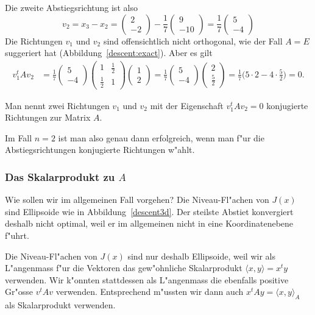 Die zweite Abstiegsrichtung ist also
\[
v_2=
x_3-x_2
=\begin{pmatrix}2\\-2\end{pmatrix}-
\frac17\begin{pmatrix}9\\-10\end{pmatrix}
=
\frac17\begin{pmatrix}5\\-4\end{pmatrix}
\]
Die Richtungen $v_1$ und $v_2$ sind offensichtlich nicht orthogonal,
wie der Fall $A=E$ suggeriert hat (Abbildung~\ref{descent:exact}).
Aber es gilt
\begin{align}
v_1^tAv_2
&=
\frac17\begin{pmatrix}5\\-4\end{pmatrix}
\begin{pmatrix}
1&\frac12\\
\frac12&1
\end{pmatrix}
\begin{pmatrix}1\\2\end{pmatrix}
=
\frac17\begin{pmatrix}5\\-4\end{pmatrix}
\begin{pmatrix}2\\\frac52\end{pmatrix}
=\frac17\biggl(5\cdot 2-4\cdot\frac52\biggr)=0.
\label{descent:ortho}
\end{align}
\begin{definition}
Man nennt zwei Richtungen $v_1$ und $v_2$ mit der Eigenschaft
$v_1^tAv_2=0$ konjugierte Richtungen zur Matrix $A$.
\end{definition}
Im Fall $n=2$ ist man also genau dann erfolgreich, wenn man f"ur
die Abstiegsrichtungen konjugierte Richtungen w"ahlt.

\subsubsection{Das Skalarprodukt zu $A$}
Wie sollen wir im allgemeinen Fall vorgehen?
Die Niveau-Fl"achen von $J(x)$ sind Ellipsoide wie in Abbildung~\ref{descent3d}.
Der steilste Abstiet konvergiert deshalb nicht optimal, weil er 
im allgemeinen nicht in eine Koordinatenebene f"uhrt.

Die Niveau-Fl"achen von $J(x)$ sind nur deshalb Ellipsoide, weil
wir als L"angenmass f"ur die Vektoren das gew"ohnliche Skalarprodukt
$\langle x,y\rangle = x^ty$ verwenden. 
Wir k"onnten stattdessen als L"angenmass die ebenfalls positive
Gr"osse $v^tAv$ verwenden.
Entsprechend m"ussten wir dann auch $x^tAy=\langle x,y\rangle_A$ als
Skalarprodukt verwenden. 

